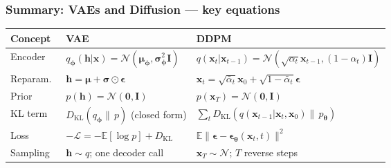 \documentclass{beamer}
\newcommand{\E}{\mathbb{E}}
\newcommand{\DKL}{D_{\mathrm{KL}}}
\newcommand{\Norm}{\mathcal{N}}
\newcommand{\ELBO}{\mathcal{L}}
\begin{document}
\begin{frame}
\frametitle{Summary: VAEs and Diffusion — key equations}

\begin{center}\small
\begin{tabular}{lll}
\toprule
\textbf{Concept} & \textbf{VAE} & \textbf{DDPM} \\
\midrule
Encoder & $q_{\bm{\phi}}(\bm{h}|\bm{x})=\Norm(\bm{\mu}_{\bm{\phi}},\bm{\sigma}^2_{\bm{\phi}}\mathbf{I})$
        & $q(\bm{x}_t|\bm{x}_{t-1})=\Norm(\sqrt{\alpha_t}\bm{x}_{t-1},(1-\alpha_t)\mathbf{I})$ \\[2pt]
Reparam.\ & $\bm{h}=\bm{\mu}+\bm{\sigma}\odot\bm{\epsilon}$
          & $\bm{x}_t=\sqrt{\bar\alpha_t}\bm{x}_0+\sqrt{1-\bar\alpha_t}\bm{\epsilon}$ \\[2pt]
Prior     & $p(\bm{h})=\Norm(\bm{0},\mathbf{I})$
          & $p(\bm{x}_T)=\Norm(\bm{0},\mathbf{I})$ \\[2pt]
KL term   & $\DKL(q_{\bm{\phi}}\|\,p)$ (closed form)
          & $\sum_t\DKL(q(\bm{x}_{t-1}|\bm{x}_t,\bm{x}_0)\|\,p_{\bm{\theta}})$ \\[2pt]
Loss      & $-\ELBO = -\E[\log p]+\DKL$
          & $\E\|\bm{\epsilon}-\bm{\epsilon}_{\bm{\theta}}(\bm{x}_t,t)\|^2$ \\[2pt]
Sampling  & $\bm{h}\sim q$; one decoder call
          & $\bm{x}_T\sim\Norm$; $T$ reverse steps \\
\bottomrule
\end{tabular}
\end{center}
\end{frame}
\end{document}
